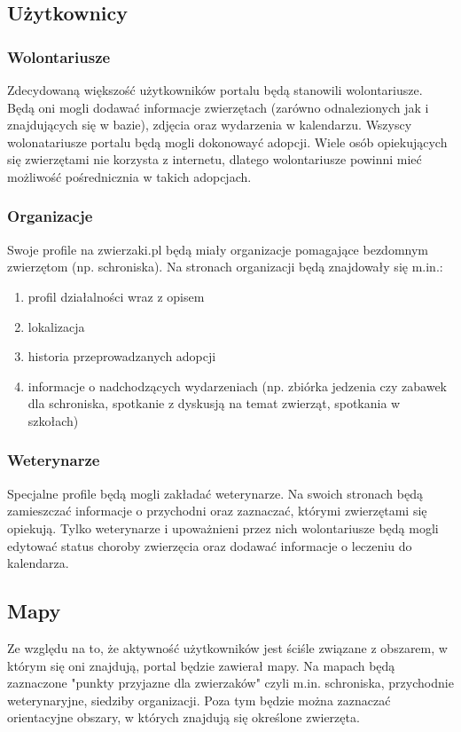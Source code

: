\documentclass[10pt,a4paper]{article}
\begin{document}
\subsection{Użytkownicy}

\subsubsection{Wolontariusze}
Zdecydowaną większość użytkowników portalu będą stanowili wolontariusze. Będą oni mogli dodawać informacje zwierzętach (zarówno odnalezionych jak i znajdujących się w bazie), zdjęcia oraz wydarzenia w kalendarzu. Wszyscy wolonatariusze portalu będą mogli dokonowayć adopcji. Wiele osób opiekujących się zwierzętami nie korzysta z internetu, dlatego wolontariusze powinni mieć możliwość pośrednicznia w takich adopcjach.
 
\subsubsection{Organizacje}
Swoje profile na zwierzaki.pl będą miały organizacje pomagające bezdomnym zwierzętom (np. schroniska). Na stronach organizacji będą znajdowały się m.in.:
\begin{enumerate}
	\item profil działalności wraz z opisem
	\item lokalizacja
	\item historia przeprowadzanych adopcji
	\item informacje o nadchodzących wydarzeniach (np. zbiórka jedzenia czy zabawek dla schroniska, spotkanie z dyskusją na temat zwierząt, spotkania w szkołach)
\end{enumerate}

\subsubsection{Weterynarze}
Specjalne profile będą mogli zakładać weterynarze. Na swoich stronach będą zamieszczać 
informacje o przychodni oraz zaznaczać, którymi zwierzętami się opiekują. Tylko weterynarze 
i upoważnieni przez nich wolontariusze będą mogli edytować status choroby zwierzęcia oraz 
dodawać informacje o leczeniu do kalendarza.

\subsection{Mapy}
Ze względu na to, że aktywność użytkowników jest ściśle związane z obszarem, w którym się oni znajdują, portal będzie zawierał mapy. Na mapach będą zaznaczone "punkty przyjazne dla zwierzaków" czyli m.in. schroniska, przychodnie weterynaryjne, siedziby organizacji. Poza tym będzie można zaznaczać orientacyjne obszary, w których znajdują się określone zwierzęta.
\end{document}
